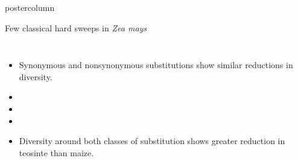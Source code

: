 \documentclass[final]{beamer}
\newlength{\columnheight}
\begin{document}
\begin{frame}
\begin{columns}
    \begin{column}{.49\textwidth}
      \begin{beamercolorbox}[center,wd=\textwidth]{postercolumn}
        \begin{minipage}[T]{.95\textwidth} %
          \parbox[t][\columnheight]{\textwidth}{ %
            \begin{block}{Few classical hard sweeps in \emph{Zea mays}}
              \begin{columns}
              \begin{itemize}
                \item Synonymous and nonsynonymous substitutions show similar reductions in diversity. %
                \item[]
                \item[]
                \item[]
                \item Diversity around both classes of substitution shows greater reduction in teosinte than maize.
              \end{itemize}
              \centering
              \end{columns}
            \end{block}
}
\end{minipage}
\end{beamercolorbox}
\end{column}
\end{columns}
\end{frame}
\end{document}
